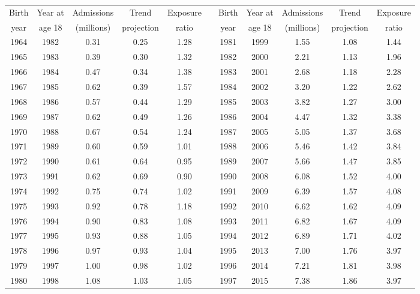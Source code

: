 \begin{tabular}{@{}ccccc@{\hspace{14pt}}c@{}ccccc@{}}
\toprule
Birth & Year at & Admissions & Trend & Exposure & & Birth & Year at & Admissions & Trend & Exposure \\
year & age 18 & (millions) & projection & ratio & & year & age 18 & (millions) & projection & ratio \\
\midrule
1964 & 1982 & 0.31 & 0.25 & 1.28 & & 1981 & 1999 & 1.55 & 1.08 & 1.44 \\
1965 & 1983 & 0.39 & 0.30 & 1.32 & & 1982 & 2000 & 2.21 & 1.13 & 1.96 \\
1966 & 1984 & 0.47 & 0.34 & 1.38 & & 1983 & 2001 & 2.68 & 1.18 & 2.28 \\
1967 & 1985 & 0.62 & 0.39 & 1.57 & & 1984 & 2002 & 3.20 & 1.22 & 2.62 \\
1968 & 1986 & 0.57 & 0.44 & 1.29 & & 1985 & 2003 & 3.82 & 1.27 & 3.00 \\
1969 & 1987 & 0.62 & 0.49 & 1.26 & & 1986 & 2004 & 4.47 & 1.32 & 3.38 \\
1970 & 1988 & 0.67 & 0.54 & 1.24 & & 1987 & 2005 & 5.05 & 1.37 & 3.68 \\
1971 & 1989 & 0.60 & 0.59 & 1.01 & & 1988 & 2006 & 5.46 & 1.42 & 3.84 \\
1972 & 1990 & 0.61 & 0.64 & 0.95 & & 1989 & 2007 & 5.66 & 1.47 & 3.85 \\
1973 & 1991 & 0.62 & 0.69 & 0.90 & & 1990 & 2008 & 6.08 & 1.52 & 4.00 \\
1974 & 1992 & 0.75 & 0.74 & 1.02 & & 1991 & 2009 & 6.39 & 1.57 & 4.08 \\
1975 & 1993 & 0.92 & 0.78 & 1.18 & & 1992 & 2010 & 6.62 & 1.62 & 4.09 \\
1976 & 1994 & 0.90 & 0.83 & 1.08 & & 1993 & 2011 & 6.82 & 1.67 & 4.09 \\
1977 & 1995 & 0.93 & 0.88 & 1.05 & & 1994 & 2012 & 6.89 & 1.71 & 4.02 \\
1978 & 1996 & 0.97 & 0.93 & 1.04 & & 1995 & 2013 & 7.00 & 1.76 & 3.97 \\
1979 & 1997 & 1.00 & 0.98 & 1.02 & & 1996 & 2014 & 7.21 & 1.81 & 3.98 \\
1980 & 1998 & 1.08 & 1.03 & 1.05 & & 1997 & 2015 & 7.38 & 1.86 & 3.97 \\
\bottomrule
\end{tabular}
